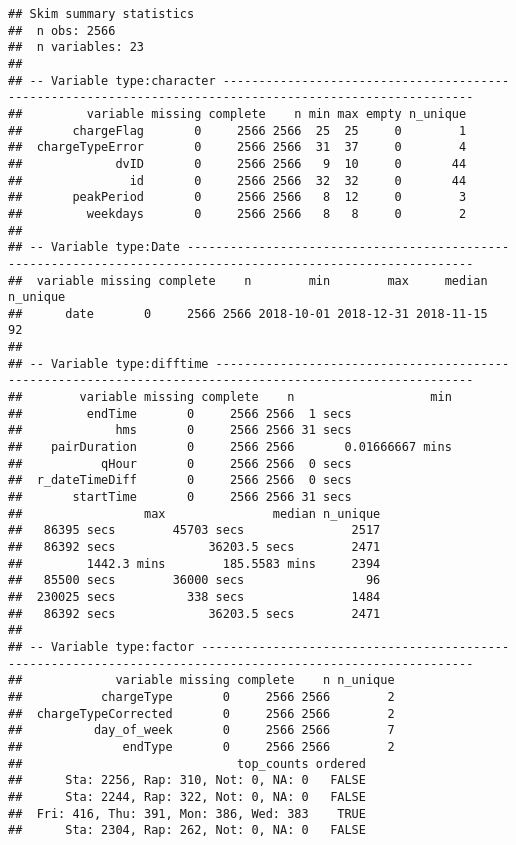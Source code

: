\documentclass[]{article}
\begin{document}
\begin{verbatim}
## Skim summary statistics
##  n obs: 2566 
##  n variables: 23 
## 
## -- Variable type:character ---------------------------------------------------------------------------------------------------------
##         variable missing complete    n min max empty n_unique
##       chargeFlag       0     2566 2566  25  25     0        1
##  chargeTypeError       0     2566 2566  31  37     0        4
##             dvID       0     2566 2566   9  10     0       44
##               id       0     2566 2566  32  32     0       44
##       peakPeriod       0     2566 2566   8  12     0        3
##         weekdays       0     2566 2566   8   8     0        2
## 
## -- Variable type:Date --------------------------------------------------------------------------------------------------------------
##  variable missing complete    n        min        max     median n_unique
##      date       0     2566 2566 2018-10-01 2018-12-31 2018-11-15       92
## 
## -- Variable type:difftime ----------------------------------------------------------------------------------------------------------
##        variable missing complete    n                   min
##         endTime       0     2566 2566  1 secs              
##             hms       0     2566 2566 31 secs              
##    pairDuration       0     2566 2566       0.01666667 mins
##           qHour       0     2566 2566  0 secs              
##  r_dateTimeDiff       0     2566 2566  0 secs              
##       startTime       0     2566 2566 31 secs              
##                 max               median n_unique
##   86395 secs        45703 secs               2517
##   86392 secs             36203.5 secs        2471
##         1442.3 mins        185.5583 mins     2394
##   85500 secs        36000 secs                 96
##  230025 secs          338 secs               1484
##   86392 secs             36203.5 secs        2471
## 
## -- Variable type:factor ------------------------------------------------------------------------------------------------------------
##             variable missing complete    n n_unique
##           chargeType       0     2566 2566        2
##  chargeTypeCorrected       0     2566 2566        2
##          day_of_week       0     2566 2566        7
##              endType       0     2566 2566        2
##                              top_counts ordered
##      Sta: 2256, Rap: 310, Not: 0, NA: 0   FALSE
##      Sta: 2244, Rap: 322, Not: 0, NA: 0   FALSE
##  Fri: 416, Thu: 391, Mon: 386, Wed: 383    TRUE
##      Sta: 2304, Rap: 262, Not: 0, NA: 0   FALSE

\end{verbatim}
\end{document}
